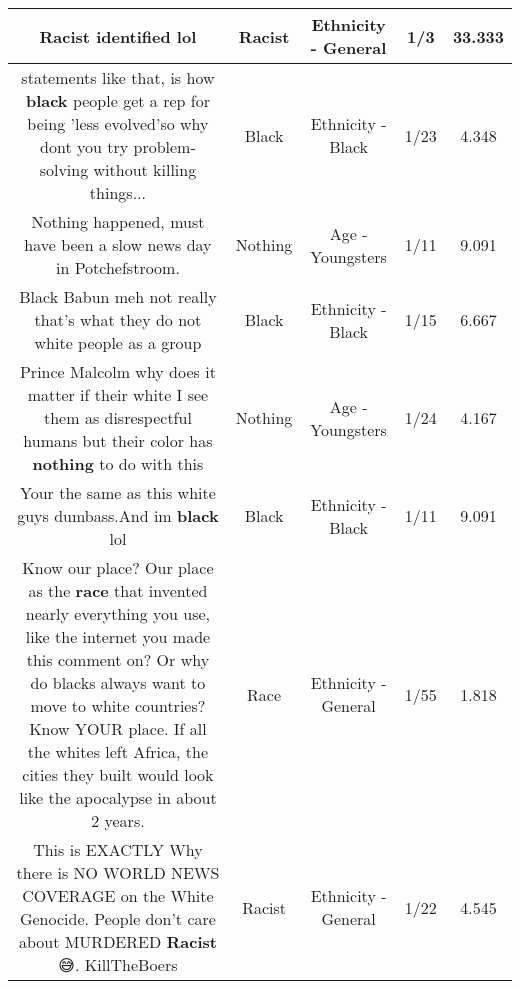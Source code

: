 \documentclass[11pt]{article}
\newlength\mylength
\begin{document}
\begin{center}
\begin{longtable}{|C{.65\mylength}|C{.30\mylength}|C{.12\mylength}|C{.12\mylength}|C{.12\mylength}|}
  \small Racist identified lol\normalsize   & Racist & Ethnicity - General & 1/3 & 33.333 \\  \hline
  \small statements like that, is how \textbf{black} people get a rep for being 'less evolved'so why dont you try problem-solving without killing things...\normalsize   & Black & Ethnicity - Black & 1/23 & 4.348 \\  \hline
  \small Nothing happened, must have been a slow news day in Potchefstroom.\normalsize   & Nothing & Age - Youngsters & 1/11 & 9.091 \\  \hline
  \small Black Babun meh not really that's what they do not white people as a group\normalsize   & Black & Ethnicity - Black & 1/15 & 6.667 \\  \hline
  \small Prince Malcolm why does it matter if their white I see them as disrespectful humans but their color has \textbf{nothing} to do with this\normalsize   & Nothing & Age - Youngsters & 1/24 & 4.167 \\  \hline
  \small Your the same as this white guys dumbass.And im \textbf{black} lol\normalsize   & Black & Ethnicity - Black & 1/11 & 9.091 \\  \hline
  \small Know our place?  Our place as the \textbf{race} that invented nearly everything you use, like the internet you made this comment on?  Or why do blacks always want to move to white countries?  Know YOUR place.  If all the whites left Africa, the cities they built would look like the apocalypse in about 2 years.\normalsize   & Race & Ethnicity - General & 1/55 & 1.818 \\  \hline
  \small This is EXACTLY Why there is NO WORLD NEWS COVERAGE on the White Genocide. People don't care about MURDERED \textbf{Racist} 😅. KillTheBoers\normalsize   & Racist & Ethnicity - General & 1/22 & 4.545 \\  \hline

\end{longtable}
\end{center}
\end{document}
